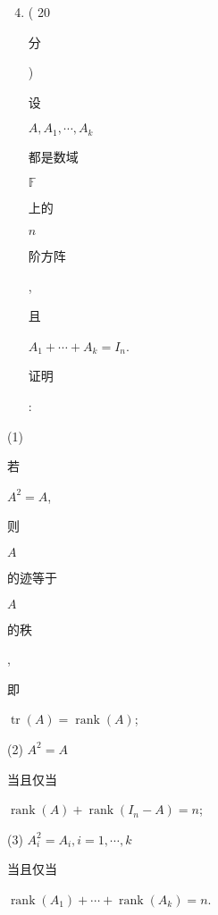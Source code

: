 \documentclass[10pt]{article}
\begin{document}
\begin{enumerate}
  \setcounter{enumi}{3}
  \item ( 20 \begin{CJK}{UTF8}{mj}分\end{CJK}) \begin{CJK}{UTF8}{mj}设\end{CJK} $A, A_{1}, \cdots, A_{k}$ \begin{CJK}{UTF8}{mj}都是数域\end{CJK} $\mathbb{F}$ \begin{CJK}{UTF8}{mj}上的\end{CJK} $n$ \begin{CJK}{UTF8}{mj}阶方阵\end{CJK}, \begin{CJK}{UTF8}{mj}且\end{CJK} $A_{1}+\cdots+A_{k}=I_{n}$. \begin{CJK}{UTF8}{mj}证明\end{CJK}:
\end{enumerate}
(1) \begin{CJK}{UTF8}{mj}若\end{CJK} $A^{2}=A$, \begin{CJK}{UTF8}{mj}则\end{CJK} $A$ \begin{CJK}{UTF8}{mj}的迹等于\end{CJK} $A$ \begin{CJK}{UTF8}{mj}的秩\end{CJK}, \begin{CJK}{UTF8}{mj}即\end{CJK} $\operatorname{tr}(A)=\operatorname{rank}(A)$;

(2) $A^{2}=A$ \begin{CJK}{UTF8}{mj}当且仅当\end{CJK} $\operatorname{rank}(A)+\operatorname{rank}\left(I_{n}-A\right)=n$;

(3) $A_{i}^{2}=A_{i}, i=1, \cdots, k$ \begin{CJK}{UTF8}{mj}当且仅当\end{CJK} $\operatorname{rank}\left(A_{1}\right)+\cdots+\operatorname{rank}\left(A_{k}\right)=n$.
\end{document}
